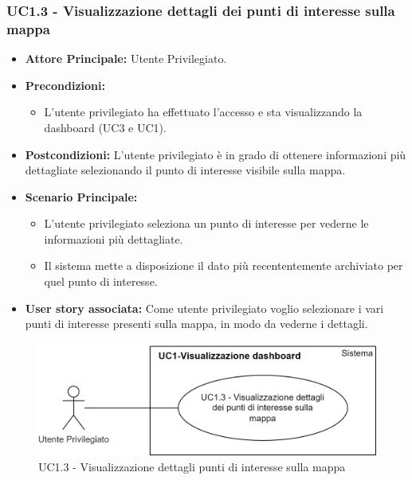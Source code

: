 \documentclass[11pt]{article}
\begin{document}
\begin{justify}
\subsubsection{\textbf{UC1.3 - Visualizzazione dettagli dei punti di interesse sulla mappa}}
\begin{itemize}
     \item \textbf{Attore Principale:} Utente Privilegiato.
     \item \textbf{Precondizioni:}
        \begin{itemize}
    		\item L'utente privilegiato ha effettuato l'accesso e sta visualizzando la dashboard (UC3 e UC1).
        \end{itemize}
     \item \textbf{Postcondizioni:} L'utente privilegiato è in grado di ottenere informazioni più dettagliate selezionando il punto di interesse visibile sulla mappa.
     \item \textbf{Scenario Principale:}
        \begin{itemize}
            \item L'utente privilegiato seleziona un punto di interesse per vederne le informazioni più dettagliate.
            \item Il sistema mette a disposizione il dato più recententemente archiviato per quel punto di interesse.
        \end{itemize}
     \item \textbf{User story associata:}
     Come utente privilegiato voglio selezionare i vari punti di interesse presenti sulla mappa, in modo da vederne i dettagli.
\end{itemize}
\begin{figure}[ht]
    \centering
    \includegraphics[width=0.5\linewidth]{UC1.3image.png}
    \caption{UC1.3 - Visualizzazione dettagli punti di interesse sulla mappa}
    \label{fig:UC1.3}
\end{figure}

\end{justify}
\end{document}
